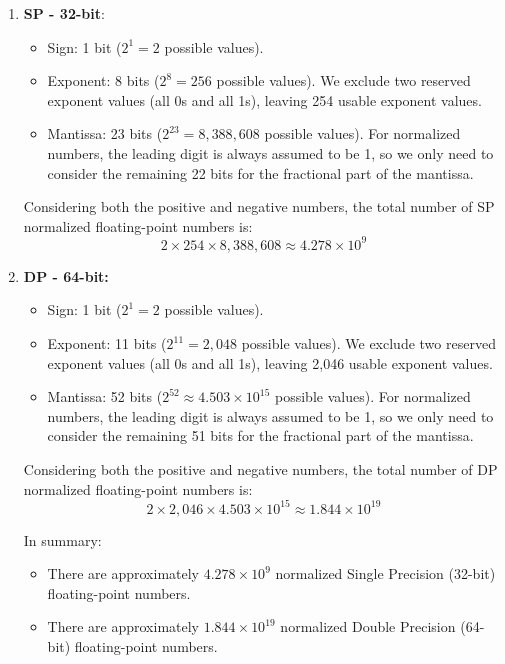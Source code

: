\documentclass{article}
\begin{document}
\begin{enumerate}
    \item \textbf{SP - 32-bit}: \begin{itemize}
        \item Sign: 1 bit ($2^1=2$ possible values).
        \item Exponent: 8 bits ($2^8 = 256$ possible values). We exclude two reserved exponent values (all 0s and all 1s), leaving 254 usable exponent values.
        \item Mantissa: 23 bits ($2^{23} = 8,388,608$ possible values). For normalized numbers, the leading digit is always assumed to be 1, so we only need to consider the remaining 22 bits for the fractional part of the mantissa.
    \end{itemize} 
    Considering both the positive and negative numbers, the total number of SP normalized floating-point numbers is: $$2 \times 254 \times 8,388,608 \approx 4.278 \times 10^9$$

    \item \textbf{DP - 64-bit:} \begin{itemize}
        \item Sign: 1 bit ($2^1=2$ possible values).
        \item Exponent: 11 bits ($2^{11} = 2,048$ possible values). We exclude two reserved exponent values (all 0s and all 1s), leaving 2,046 usable exponent values.
        \item Mantissa: 52 bits ($2^{52} \approx 4.503 \times 10^{15}$ possible values). For normalized numbers, the leading digit is always assumed to be 1, so we only need to consider the remaining 51 bits for the fractional part of the mantissa.
    \end{itemize}
    Considering both the positive and negative numbers, the total number of DP normalized floating-point numbers is: $$2 \times 2,046 \times 4.503 \times 10^{15} \approx 1.844 \times 10^{19}$$

    In summary: 

    \begin{itemize}
        \item There are approximately $4.278 \times 10^9$ normalized Single Precision (32-bit) floating-point numbers.
        \item There are approximately $1.844 \times 10^{19}$ normalized Double Precision (64-bit) floating-point numbers.
    \end{itemize}
\end{enumerate}
\end{document}
